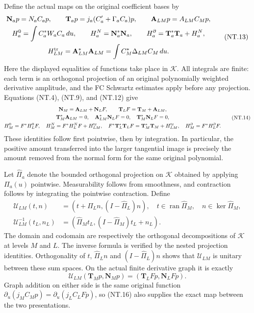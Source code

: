 \documentclass[11pt]{article}
\newcommand{\ran}{\operatorname{ran}}
\begin{document}
Define the actual maps on the original coefficient bases by
\[
 \begin{gathered}
 \mathbf N_a p=N_aC_ap,\qquad
 \mathbf T_a p=j_a(C_a'+\Gamma_a C_a)p,\qquad
 \mathbf A_{LM}p=A_{LM}C_Mp,\\
 H_a^0=\int C_a^*W_aC_a\,du,\qquad
 H_a^N=\mathbf N_a^*\mathbf N_a,\qquad
 H_a^\partial=\mathbf T_a^*\mathbf T_a+H_a^N,\\
 H_{LM}^{\rm tr}=\mathbf A_{LM}^*\mathbf A_{LM}
                    =\int C_M^*\Delta_{LM}C_M\,du.
 \end{gathered}
 \tag{NT.13}
\]
Here the displayed equalities of functions take place in $\mathscr K$.
All integrals are finite: each term is an orthogonal projection
of an original polynomially weighted derivative amplitude, and
the FC Schwartz estimates apply before any projection. Equations
(NT.4), (NT.9), and (NT.12) give
\[
 \begin{gathered}
 \mathbf N_M=\mathbf A_{LM}+\mathbf N_LF,\qquad
 \mathbf T_LF=\mathbf T_M+\mathbf A_{LM},\\
 \mathbf T_M^*\mathbf A_{LM}=0,\quad
 \mathbf A_{LM}^*\mathbf N_LF=0,\quad
 \mathbf T_M^*\mathbf N_LF=0,\\
 H_M^0=F^*H_L^0F,\quad
 H_M^N=F^*H_L^NF+H_{LM}^{\rm tr},\quad
 F^*\mathbf T_L^*\mathbf T_LF
        =\mathbf T_M^*\mathbf T_M+H_{LM}^{\rm tr},\quad
 H_M^\partial=F^*H_L^\partial F.
 \end{gathered}
 \tag{NT.14}
\]
These identities follow first pointwise, then by integration.
In particular, the positive amount transferred into the larger
tangential image is precisely the amount removed from the normal
form for the same original polynomial.

Let $\widehat\Pi_a$ denote the bounded orthogonal projection on
$\mathscr K$ obtained by applying $\Pi_a(u)$ pointwise.
Measurability follows from smoothness, and contraction follows
by integrating the pointwise contraction. Define
\[
 \begin{aligned}
 \mathcal U_{LM}(t,n)
    &=(t+\widehat\Pi_Ln,(I-\widehat\Pi_L)n),\quad
       t\in\ran\widehat\Pi_M,\quad n\in\ker\widehat\Pi_M,\\
 \mathcal U_{LM}^{-1}(t_L,n_L)
    &=(\widehat\Pi_Mt_L,
           (I-\widehat\Pi_M)t_L+n_L).
 \end{aligned}
 \tag{NT.15}
\]
The domain and codomain are respectively the orthogonal decompositions
of $\mathscr K$ at levels $M$ and $L$. The inverse formula is
verified by the nested projection identities. Orthogonality of
$t$, $\widehat\Pi_Ln$ and $(I-\widehat\Pi_L)n$ shows that
$\mathcal U_{LM}$ is unitary between these sum spaces.
On the actual finite derivative graph it is exactly
\[
 \mathcal U_{LM}(\mathbf T_Mp,\mathbf N_Mp)
       =(\mathbf T_LFp,\mathbf N_LFp).
 \tag{NT.16}
\]
Graph addition on either side is the same original function
$\partial_u(j_MC_Mp)=\partial_u(j_LC_LFp)$, so (NT.16)
also supplies the exact map between the two presentations.
\end{document}
